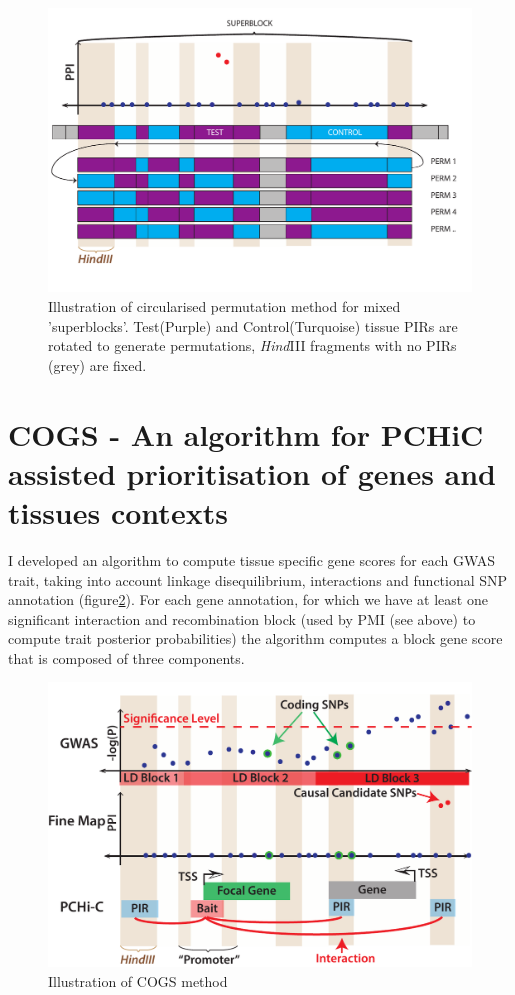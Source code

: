 \documentclass[a4paper,11pt]{report}
\begin{document}
\begin{figure}[h]

\includegraphics[width=\textwidth]{blockshifter.pdf}
\caption{Illustration of circularised permutation method for mixed 'superblocks'. Test(Purple) and Control(Turquoise) tissue PIRs are rotated to generate permutations, \textit{Hind}III fragments with no PIRs (grey) are fixed.}
\label{fig:blockshifter}
\centering
\end{figure}

\section{COGS - An algorithm for PCHiC assisted prioritisation of genes and tissues contexts}
I developed an algorithm to compute tissue specific gene scores for each GWAS trait, taking into account linkage disequilibrium, interactions and functional SNP annotation (figure\ref{fig:cogs}). For each gene annotation, for which we have at least one significant interaction and recombination block (used by PMI (see above) to compute trait posterior probabilities) the algorithm computes a block gene score that is composed of three components.

\begin{figure}[h]
\includegraphics[width=\textwidth]{cogs3.pdf}
\caption{Illustration of COGS method}
\label{fig:cogs}
\centering
\end{figure}
\end{document}

